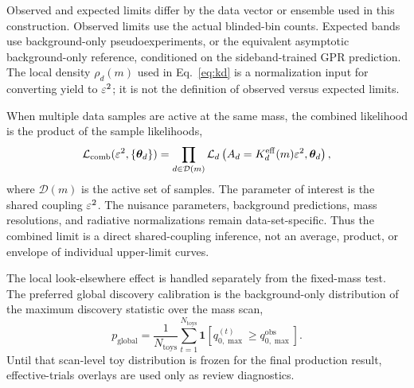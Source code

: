 Observed and expected limits differ by the data vector or ensemble used in this
construction. Observed limits use the actual blinded-bin counts. Expected bands use
background-only pseudoexperiments, or the equivalent asymptotic background-only
reference, conditioned on the sideband-trained GPR prediction. The local density
$\rho_d(m)$ used in Eq.~\eqref{eq:kd} is a normalization input for converting yield to
$\varepsilon^2$; it is not the definition of observed versus expected limits.

When multiple data samples are active at the same mass, the combined likelihood is the
product of the sample likelihoods,
\begin{equation}
\mathcal{L}_{\mathrm{comb}}(\varepsilon^2,\{\bm{\theta}_d\})
=
\prod_{d\in\mathcal{D}(m)}
\mathcal{L}_d\left(A_d=K_d^{\mathrm{eff}}(m)\varepsilon^2,\bm{\theta}_d\right),
\label{eq:combined-likelihood}
\end{equation}
where $\mathcal{D}(m)$ is the active set of samples. The parameter of interest is the
shared coupling $\varepsilon^2$. The nuisance parameters, background predictions, mass
resolutions, and radiative normalizations remain data-set-specific. Thus the combined
limit is a direct shared-coupling inference, not an average, product, or envelope of
individual upper-limit curves.

The local look-elsewhere effect is handled separately from the fixed-mass test. The
preferred global discovery calibration is the background-only distribution of the
maximum discovery statistic over the mass scan,
\begin{equation}
p_{\mathrm{global}}=
\frac{1}{N_{\mathrm{toys}}}
\sum_{t=1}^{N_{\mathrm{toys}}}
\mathbf{1}\left[q_{0,\max}^{(t)}\ge q_{0,\max}^{\mathrm{obs}}\right].
\end{equation}
Until that scan-level toy distribution is frozen for the final production result,
effective-trials overlays are used only as review diagnostics.

